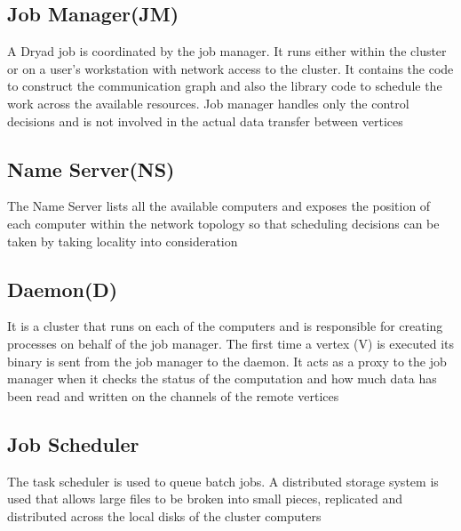 \documentclass[9pt,twocolumn,twoside]{../../styles/osajnl}
\begin{document}
\subsection{Job Manager(JM)}
A Dryad job is coordinated by the job manager. It runs either within
the cluster or on a user’s workstation with network access to the
cluster. It contains the code to construct the communication graph and
also the library code to schedule the work across the available
resources. Job manager handles only the control decisions and is not
involved in the actual data transfer between vertices\cite{DryadMSR2}


\subsection{Name Server(NS)} 
The Name Server lists all the available computers and exposes the
position of each computer within the network topology so that
scheduling decisions can be taken by taking locality into
consideration \cite{DryadMSR2}

\subsection{Daemon(D)}
It is a cluster that runs on each of the computers and is responsible
for creating processes on behalf of the job manager. The first time a
vertex (V) is executed its binary is sent from the job manager to the
daemon. It acts as a proxy to the job manager when it checks the
status of the computation and how much data has been read and written
on the channels of the remote vertices \cite{DryadMSR2}

\subsection{Job Scheduler}
The task scheduler is used to queue batch jobs. A distributed storage
system is used that allows large files to be broken into small pieces,
replicated and distributed across the local disks of the cluster
computers \cite{DryadMSR2}


\end{document}

